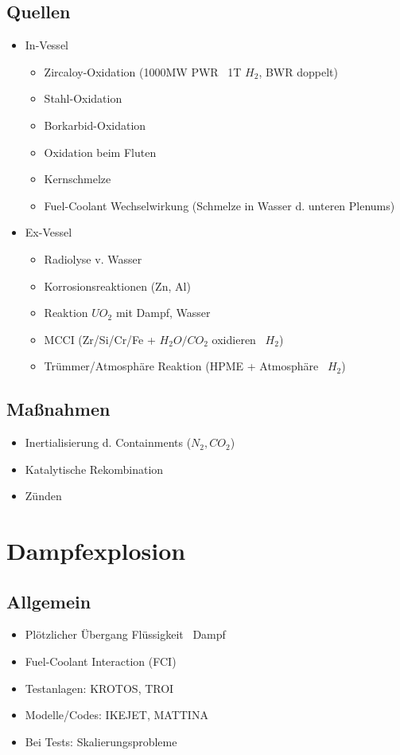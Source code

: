 \documentclass[12pt]{article}
\begin{document}
\subsection{Quellen}
\begin{itemize}
	\item In-Vessel
		\begin{itemize}
			\item Zircaloy-Oxidation (1000MW PWR \textrightarrow\ 1T \(H_2\), BWR doppelt)
			\item Stahl-Oxidation
			\item Borkarbid-Oxidation
			\item Oxidation beim Fluten
			\item Kernschmelze
			\item Fuel-Coolant Wechselwirkung (Schmelze in Wasser d. unteren Plenums)
		\end{itemize}
	\item Ex-Vessel
		\begin{itemize}
			\item Radiolyse v. Wasser
			\item Korrosionsreaktionen (Zn, Al)
			\item Reaktion \(UO_2\) mit Dampf, Wasser
			\item MCCI (Zr/Si/Cr/Fe + \(H_2O/CO_2\) oxidieren \textrightarrow\ \(H_2\))
			\item Trümmer/Atmosphäre Reaktion (HPME + Atmosphäre \textrightarrow\ \(H_2\))
		\end{itemize}
\end{itemize}

\subsection{Maßnahmen}
\begin{itemize}
	\item Inertialisierung d. Containments (\(N_2, CO_2\))
	\item Katalytische Rekombination
	\item Zünden
\end{itemize}

\section{Dampfexplosion}

\subsection{Allgemein}
\begin{itemize}
	\item Plötzlicher Übergang Flüssigkeit \textrightarrow\ Dampf
	\item Fuel-Coolant Interaction (FCI)
	\item Testanlagen: KROTOS, TROI
	\item Modelle/Codes: IKEJET, MATTINA
	\item Bei Tests: Skalierungsprobleme
\end{itemize}
\end{document}
